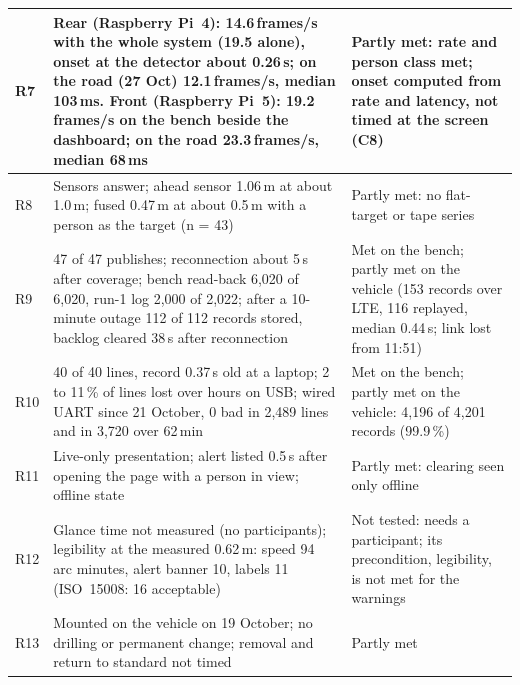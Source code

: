 \begin{table}[htbp]
\begin{tabular}{|p{0.8cm}|p{7.6cm}|p{5.4cm}|}
R7 & Rear (Raspberry Pi~4): 14.6\,frames/s with the whole system (19.5 alone), onset at the detector about 0.26\,s; on the road (27 Oct) 12.1\,frames/s, median 103\,ms. Front (Raspberry Pi~5): 19.2\,frames/s on the bench beside the dashboard; on the road 23.3\,frames/s, median 68\,ms & Partly met: rate and person class met; onset computed from rate and latency, not timed at the screen (C8) \\ \hline
R8 & Sensors answer; ahead sensor 1.06\,m at about 1.0\,m; fused 0.47\,m at about 0.5\,m with a person as the target (n = 43) & Partly met: no flat-target or tape series \\ \hline
R9 & 47 of 47 publishes; reconnection about 5\,s after coverage; bench read-back 6,020 of 6,020, run-1 log 2,000 of 2,022; after a 10-minute outage 112 of 112 records stored, backlog cleared 38\,s after reconnection & Met on the bench; partly met on the vehicle (153 records over LTE, 116 replayed, median 0.44\,s; link lost from 11:51) \\ \hline
R10 & 40 of 40 lines, record 0.37\,s old at a laptop; 2 to 11\,\% of lines lost over hours on USB; wired UART since 21 October, 0 bad in 2,489 lines and in 3,720 over 62\,min & Met on the bench; partly met on the vehicle: 4,196 of 4,201 records (99.9\,\%) \\ \hline
R11 & Live-only presentation; alert listed 0.5\,s after opening the page with a person in view; offline state & Partly met: clearing seen only offline \\ \hline
R12 & Glance time not measured (no participants); legibility at the measured 0.62\,m: speed 94 arc minutes, alert banner 10, labels 11 (ISO~15008: 16 acceptable) & Not tested: needs a participant; its precondition, legibility, is not met for the warnings \\ \hline
R13 & Mounted on the vehicle on 19 October; no drilling or permanent change; removal and return to standard not timed & Partly met \\ \hline
\end{tabular}
\end{table}

